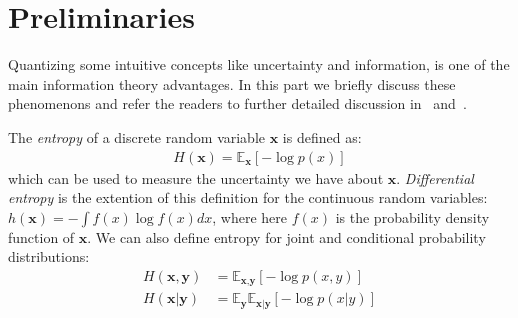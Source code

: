 \documentclass[10pt,journal,compsoc]{IEEEtran}
\begin{document}





\appendices\section{Preliminaries}\label{appendix:A}

Quantizing some intuitive concepts like uncertainty and information, is one of the main information theory advantages. In this part we briefly discuss these phenomenons and refer the readers to further detailed discussion in~\cite{cover2012} and~\cite{haykin2009}.

The \emph{entropy} of a discrete random variable $\textbf{x}$ is defined as:
\begin{align*}
H(\textbf{x}) = \mathds{E}_\textbf{x}  [-\log p(x)]
\end{align*} 
which can be used to measure the uncertainty we have about $\textbf{x}$. \emph{Differential entropy} is the extention of this definition for the continuous random variables: $h(\textbf{x}) = -\int f(x) \log f(x) dx$, where here $f(x)$ is the probability density function of $\textbf{x}$. We can also define entropy for joint and conditional probability distributions:
\begin{align*}
H(\textbf{x},\textbf{y}) &= \mathds{E}_{\textbf{x},\textbf{y}}  [-\log p(x,y)] \\
H(\textbf{x}|\textbf{y}) &= \mathds{E}_{\textbf{y}} \mathds{E}_{\textbf{x}|\textbf{y}}  [-\log p(x|y)] 
\end{align*}
\end{document}
